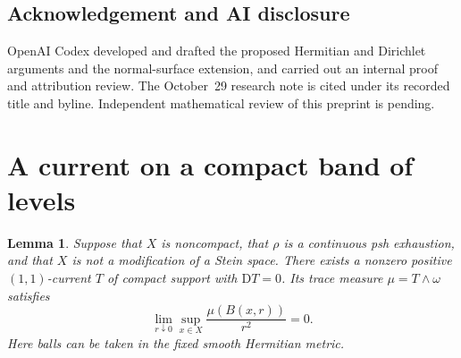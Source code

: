 \documentclass[11pt]{amsart}
\newtheorem{lemma}[theorem]{Lemma}
\theoremstyle{remark}
\numberwithin{equation}{section}
\newcommand{\D}{\mathrm{D}}
\begin{document}
\subsection*{Acknowledgement and AI disclosure}
OpenAI Codex developed and drafted the proposed Hermitian and Dirichlet
arguments and the normal-surface extension, and carried out an internal
proof and attribution review. The October~29 research note is cited under its
recorded title and byline. Independent mathematical review of this
preprint is pending.

\section{A current on a compact band of levels}

\begin{lemma}\label{lem:shell}
Suppose that \(X\) is noncompact, that \(\rho\) is a continuous psh
exhaustion, and that \(X\) is not a modification of a Stein space. There
exists a nonzero positive \((1,1)\)-current \(T\) of compact support
with \(\D T=0\). Its trace measure \(\mu=T\wedge\omega\) satisfies
\[
 \lim_{r\downarrow0}\sup_{x\in X}\frac{\mu(B(x,r))}{r^2}=0 .
\]
Here balls can be taken in the fixed smooth Hermitian metric.
\end{lemma}
\end{document}
